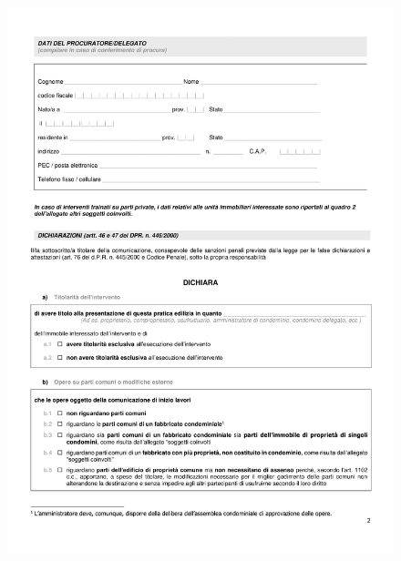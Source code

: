 \documentclass{elegantbook}
\begin{document}
		\begin{figure}[H]
			\centering
			\includegraphics[scale=0.8]{../Img/Documents/CILAS/CILAS-2.png}
		\end{figure}
\end{document}
